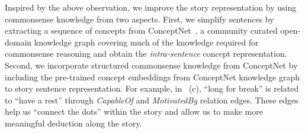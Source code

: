 Inspired by the above observation, we improve the story representation
by using commonsense knowledge from two aspects.
First, we simplify sentences by extracting a sequence of concepts from
ConceptNet~\cite{speer2017conceptnet}, a community curated open-domain 
knowledge graph covering much of the knowledge required for commonsense 
reasoning
and obtain the {\em intra-sentence} concept representation.
Second, we incorporate structured commonsense knowledge 
from ConceptNet
by including the pre-trained concept 
embeddings from ConceptNet knowledge graph to story sentence representation. 
For example, in ~(c),  ``long for break'' is related to ``have a rest''
through {\em CapableOf} and {\em MotivatedBy} relation edges.
These edges help us ``connect the dots'' within the story and allow us
to make more meaningful deduction along the story.


